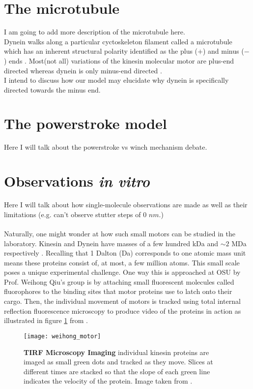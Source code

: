 \section{The microtubule}
I am going to add more description of the microtubule here. \\

Dynein walks along a particular cyctoskeleton filament called a microtubule which has an inherent structural polarity identified as the plus ($+$) and minus ($-$) ends \cite{lodish_microtubule_2000}. Most(not all) variations of the kinesin molecular motor are plus-end directed whereas dynein is only minus-end directed \cite{alberts_molecular_2002}. \\

I intend to discuss how our model may elucidate why dynein is specifically directed towards the minus end. 

\section{The powerstroke model} 
Here I will talk about the powerstroke vs winch mechanism debate. 

\section{Observations \textit{in vitro}} 
Here I will talk about how single-molecule observations are made as well as their limitations (e.g. can't observe stutter steps of $0$ $nm$.) \\\\

Naturally, one might wonder at how such small motors can be studied in the laboratory. Kinesin and Dynein have masses of a few hundred kDa and  $\sim2$ MDa respectively \cite{liao_kinesin_1998, johnson_structure_1983}. Recalling that 1 Dalton (Da) corresponds to one atomic mass unit means these proteins consist of, at most, a few million atoms. This small scale poses a unique experimental challenge. One way this is approached at OSU by Prof. Weihong Qiu's group is by attaching small fluorescent molecules called fluorophores to the binding sites that motor proteins use to latch onto their cargo. Then, the individual movement of motors is tracked using total internal reflection fluorescence microscopy to produce video of the proteins in action as illustrated in figure \ref{fig:weihong tirf} from \cite{qiu_dynein_2012}. 

\begin{figure}[!hbt]
	\centering
	\texttt{[image: weihong\_motor]}
	\caption{\textbf{TIRF Microscopy Imaging} individual kinesin proteins are imaged as small green dots and tracked as they move. Slices at different times are stacked so that the slope of each green line indicates the velocity of the protein. Image taken from \cite{qiu_dynein_2012}.}
	\label{fig:weihong tirf}
\end{figure}

